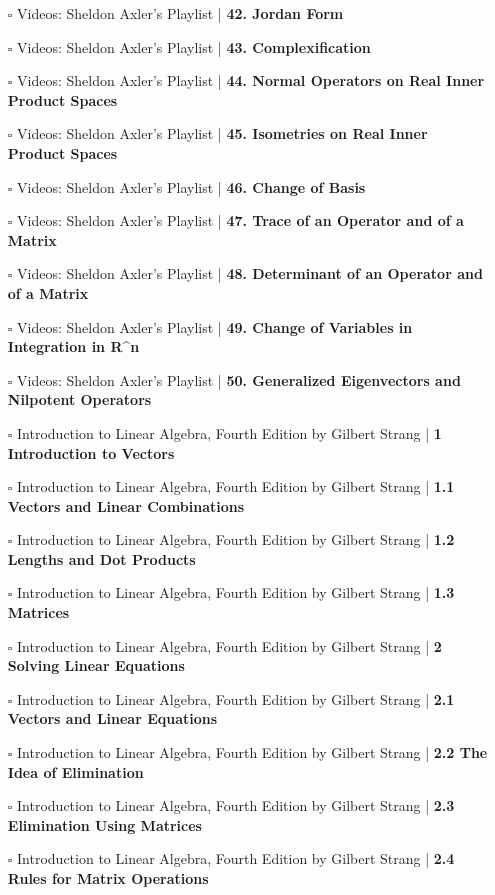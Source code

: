 \documentclass[a4, landscape, 12pt]{article}
\newcommand{\checkbox}{$\square$}%
\begin{document}
\begin{itemize}
{}
\item [\checkbox] Videos: Sheldon Axler’s Playlist  | \textbf{42. Jordan Form
}
\item [\checkbox] Videos: Sheldon Axler’s Playlist  | \textbf{43. Complexification
}
\item [\checkbox] Videos: Sheldon Axler’s Playlist  | \textbf{44. Normal Operators on Real Inner Product Spaces
}
\item [\checkbox] Videos: Sheldon Axler’s Playlist  | \textbf{45. Isometries on Real Inner Product Spaces
}
\item [\checkbox] Videos: Sheldon Axler’s Playlist  | \textbf{46. Change of Basis
}
\item [\checkbox] Videos: Sheldon Axler’s Playlist  | \textbf{47. Trace of an Operator and of a Matrix
}
\item [\checkbox] Videos: Sheldon Axler’s Playlist  | \textbf{48. Determinant of an Operator and of a Matrix
}
\item [\checkbox] Videos: Sheldon Axler’s Playlist  | \textbf{49. Change of Variables in Integration in R^n
}
\item [\checkbox] Videos: Sheldon Axler’s Playlist  | \textbf{50. Generalized Eigenvectors and Nilpotent Operators
}
\item [\checkbox] Introduction to Linear Algebra, Fourth Edition by Gilbert Strang  | \textbf{1 Introduction to Vectors
}
\item [\checkbox] Introduction to Linear Algebra, Fourth Edition by Gilbert Strang  | \textbf{1.1 Vectors and Linear Combinations
}
\item [\checkbox] Introduction to Linear Algebra, Fourth Edition by Gilbert Strang  | \textbf{1.2 Lengths and Dot Products
}
\item [\checkbox] Introduction to Linear Algebra, Fourth Edition by Gilbert Strang  | \textbf{1.3 Matrices
}
\item [\checkbox] Introduction to Linear Algebra, Fourth Edition by Gilbert Strang  | \textbf{2 Solving Linear Equations
}
\item [\checkbox] Introduction to Linear Algebra, Fourth Edition by Gilbert Strang  | \textbf{2.1 Vectors and Linear Equations
}
\item [\checkbox] Introduction to Linear Algebra, Fourth Edition by Gilbert Strang  | \textbf{2.2 The Idea of Elimination
}
\item [\checkbox] Introduction to Linear Algebra, Fourth Edition by Gilbert Strang  | \textbf{2.3 Elimination Using Matrices
}
\item [\checkbox] Introduction to Linear Algebra, Fourth Edition by Gilbert Strang  | \textbf{2.4 Rules for Matrix Operations
}
\end{itemize}
\end{document}
